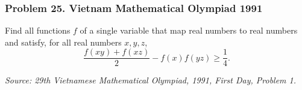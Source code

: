 \subsubsection*{Problem 25. Vietnam Mathematical Olympiad 1991}

\begin{exercisebox}[medium]

Find all functions $f$ of a single variable that map
real numbers to real numbers and satisfy, for all
real numbers $x,y,z$,
\[
\frac{f(xy)+f(xz)}{2}
-f(x)f(yz)\geq\frac14.
\]

\noindent
\textit{Source: 29th Vietnamese Mathematical Olympiad,
1991, First Day, Problem 1.}


\end{exercisebox}